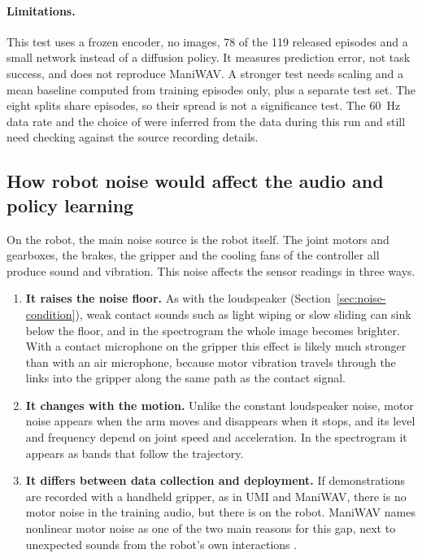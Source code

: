 \documentclass[
  english,
  accentcolor=11b,
  type=intern,
  marginpar=false,
  logofile=figures/PEARLTUDA.png
]{tudapub}
\DeclareRobustCommand{\code}[1]{\texttt{\detokenize{#1}}}
\begin{document}
\paragraph{Limitations.} This test uses a frozen encoder, no images, 78 of the 119 released episodes and a small network instead of a diffusion policy. It measures prediction error, not task success, and does not reproduce ManiWAV. A stronger test needs scaling and a mean baseline computed from training episodes only, plus a separate test set. The eight splits share episodes, so their spread is not a significance test. The \SI{60}{\hertz} data rate and the choice of \code{mic_0} were inferred from the data during this run and still need checking against the source recording details.

\subsection{How robot noise would affect the audio and policy learning}
\label{sec:robot-noise}

On the robot, the main noise source is the robot itself. The joint motors and gearboxes, the brakes, the gripper and the cooling fans of the controller all produce sound and vibration. This noise affects the sensor readings in three ways.

\begin{enumerate}[leftmargin=*]
  \item \textbf{It raises the noise floor.} As with the loudspeaker (Section~\ref{sec:noise-condition}), weak contact sounds such as light wiping or slow sliding can sink below the floor, and in the spectrogram the whole image becomes brighter. With a contact microphone on the gripper this effect is likely much stronger than with an air microphone, because motor vibration travels through the links into the gripper along the same path as the contact signal.
  \item \textbf{It changes with the motion.} Unlike the constant loudspeaker noise, motor noise appears when the arm moves and disappears when it stops, and its level and frequency depend on joint speed and acceleration. In the spectrogram it appears as bands that follow the trajectory.
  \item \textbf{It differs between data collection and deployment.} If demonstrations are recorded with a handheld gripper, as in UMI and ManiWAV, there is no motor noise in the training audio, but there is on the robot. ManiWAV names nonlinear motor noise as one of the two main reasons for this gap, next to unexpected sounds from the robot's own interactions \citep{liu2024maniwav}.
\end{enumerate}
\end{document}
